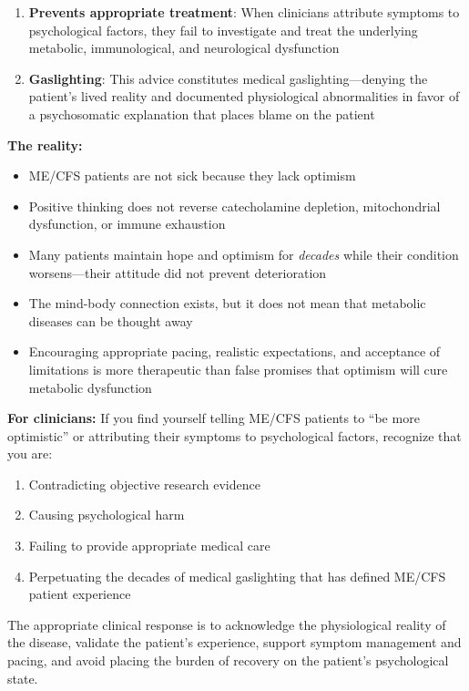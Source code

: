 \begin{warning}
\begin{enumerate}
    \item \textbf{Prevents appropriate treatment}: When clinicians attribute symptoms to psychological factors, they fail to investigate and treat the underlying metabolic, immunological, and neurological dysfunction

    \item \textbf{Gaslighting}: This advice constitutes medical gaslighting---denying the patient's lived reality and documented physiological abnormalities in favor of a psychosomatic explanation that places blame on the patient
\end{enumerate}

\textbf{The reality:}
\begin{itemize}
    \item ME/CFS patients are not sick because they lack optimism
    \item Positive thinking does not reverse catecholamine depletion, mitochondrial dysfunction, or immune exhaustion
    \item Many patients maintain hope and optimism for \textit{decades} while their condition worsens---their attitude did not prevent deterioration
    \item The mind-body connection exists, but it does not mean that metabolic diseases can be thought away
    \item Encouraging appropriate pacing, realistic expectations, and acceptance of limitations is more therapeutic than false promises that optimism will cure metabolic dysfunction
\end{itemize}

\textbf{For clinicians:} If you find yourself telling ME/CFS patients to ``be more optimistic'' or attributing their symptoms to psychological factors, recognize that you are:
\begin{enumerate}
    \item Contradicting objective research evidence
    \item Causing psychological harm
    \item Failing to provide appropriate medical care
    \item Perpetuating the decades of medical gaslighting that has defined ME/CFS patient experience
\end{enumerate}

The appropriate clinical response is to acknowledge the physiological reality of the disease, validate the patient's experience, support symptom management and pacing, and avoid placing the burden of recovery on the patient's psychological state.
\end{warning}

